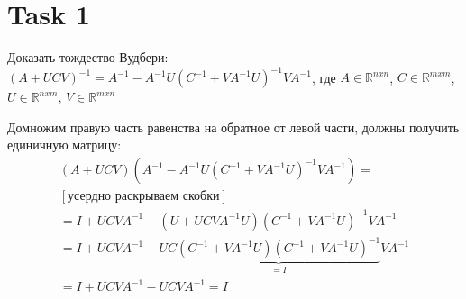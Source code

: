 \section{Task 1}

\begin{task}
    Доказать тождество Вудбери: $(A + UCV)^{-1} = A^{-1} - A^{-1}U(C^{-1} + VA^{-1}U)^{-1}VA^{-1}$, где $A \in \mathbb{R}^{n x n}$, $C \in \mathbb{R}^{m x m}$, $U \in \mathbb{R}^{n x m}$, $V \in \mathbb{R}^{m x n}$
\end{task}


\begin{solution}
    Домножим правую часть равенства на обратное от левой части, должны получить единичную матрицу:
    \begin{gather}
        (A + UCV)(A^{-1} - A^{-1}U(C^{-1} + VA^{-1}U)^{-1}VA^{-1}) = \\
        [\text{усердно раскрываем скобки}] \\
        = I + UCVA^{-1} - (U + UCVA^{-1}U)(C^{-1} + VA^{-1}U)^{-1}VA^{-1} \\
        = I + UCVA^{-1} - UC\underbrace{(C^{-1} + VA^{-1}U)(C^{-1} + VA^{-1}U)^{-1}}_{=I}VA^{-1} \\
        = I + UCVA^{-1} - UCVA^{-1} = I
    \end{gather}
\end{solution}
